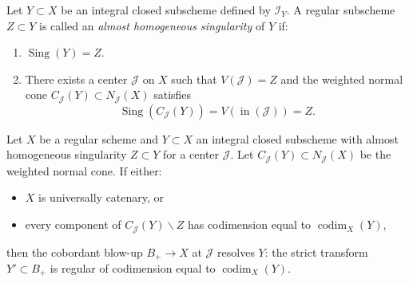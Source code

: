 \documentclass{amsart}
\newcommand{\cI}{{\mathcal I}}
\newcommand{\cJ}{{\mathcal J}}
\newcommand{\inn}{\operatorname{in}}
\newcommand{\Sing}{{\operatorname{Sing}}}
\newcommand{\codim}{\operatorname{codim}}
\renewcommand{\setminus}{\smallsetminus}
\begin{document}
\begin{definition}
Let $Y \subset X$ be an integral closed subscheme defined by $\cI_Y$. A regular subscheme $Z \subset Y$ is called an \emph{almost homogeneous singularity} of $Y$ if:
\begin{enumerate}
  \item $\Sing(Y) = Z$.
  \item There exists a center $\cJ$ on $X$ such that $V(\cJ) = Z$ and the weighted normal cone $C_{\cJ}(Y) \subset N_{\cJ}(X)$ satisfies
  \[
  \Sing(C_{\cJ}(Y)) = V(\inn(\cJ)) = Z.
  \]
\end{enumerate}
\end{definition}

\begin{theorem} \label{Homoge1}
Let $X$ be a regular scheme and $Y \subset X$ an integral closed subscheme with almost homogeneous singularity $Z \subset Y$ for a center $\cJ$. Let $C_{\cJ}(Y) \subset N_{\cJ}(X)$ be the weighted normal cone. If either:
\begin{itemize}
  \item $X$ is universally catenary, or
  \item every component of $C_{\cJ}(Y) \setminus Z$ has codimension equal to $\codim_X(Y)$,
\end{itemize}
then the cobordant blow-up $B_+ \to X$ at $\cJ$ resolves $Y$: the strict transform $Y' \subset B_+$ is regular of codimension equal to $\codim_X(Y)$.
\end{theorem}
\end{document}
